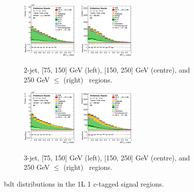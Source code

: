 \begin{figure}[h!]
    \centering
    \begin{subfigure}[b]{\textwidth}
        \centering
        \includegraphics[width=0.32\textwidth]{Images/VH/Own_fit/postfit_VHcc/Region_distmva_BMax250_BMin150_DSR_J2_TTypent_T1_L1_Y6051_GlobalFit_conditionnal_mu1.png}
        \includegraphics[width=0.32\textwidth]{Images/VH/Own_fit/postfit_VHcc/Region_distmva_BMin250_DSR_J2_TTypent_T1_L1_Y6051_GlobalFit_conditionnal_mu1.png}
        \caption{2-jet, [75, 150] GeV (left), [150, 250] GeV (centre), and 250  GeV $\leq$ (right) \ptv\ regions.}
        \label{fig:plots_VHcc_1L_SR_2J_1c}
    \end{subfigure}
    \begin{subfigure}[b]{\textwidth}
        \centering
        \includegraphics[width=0.32\textwidth]{Images/VH/Own_fit/postfit_VHcc/Region_distmva_BMax250_BMin150_DSR_J3_TTypent_T1_L1_Y6051_GlobalFit_conditionnal_mu1.png}
        \includegraphics[width=0.32\textwidth]{Images/VH/Own_fit/postfit_VHcc/Region_distmva_BMin250_DSR_J3_TTypent_T1_L1_Y6051_GlobalFit_conditionnal_mu1.png}
        \caption{3-jet, [75, 150] GeV (left), [150, 250] GeV (centre), and 250  GeV $\leq$ (right) \ptv\ regions.}
        \label{fig:plots_VHcc_1L_SR_3J_1c}
    \end{subfigure}
    \caption{\gls{bdt} distributions in the 1L 1 $c$-tagged signal regions.}
    \label{fig:plots_VHcc_1L_SR_1c}
\end{figure}

